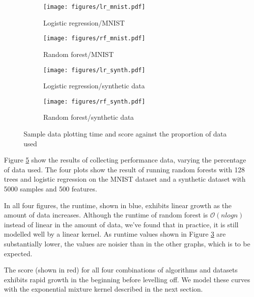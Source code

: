 \documentclass[a4paper,12pt,twoside,openright]{report}
\begin{document}
\begin{figure}
\centering
\begin{subfigure}{.45\textwidth}
  \centering
  \texttt{[image: figures/lr\_mnist.pdf]}
  \caption{Logistic regression/MNIST}
  \label{sampledata1}
\end{subfigure}%
\begin{subfigure}{.45\textwidth}
  \centering
  \texttt{[image: figures/rf\_mnist.pdf]}
  \caption{Random forest/MNIST}
  \label{sampledata2}
\end{subfigure}
\begin{subfigure}{.45\textwidth}
  \centering
  \texttt{[image: figures/lr\_synth.pdf]}
  \caption{Logistic regression/synthetic data}
  \label{sampledata3}
\end{subfigure}
\begin{subfigure}{.45\textwidth}
  \centering
  \texttt{[image: figures/rf\_synth.pdf]}
  \caption{Random forest/synthetic data}
  \label{sampledata4}
\end{subfigure}
\caption{Sample data plotting time and score against the proportion of data used}
\label{sampledata}
\end{figure}




Figure \ref{sampledata} show the results of collecting performance data, varying the percentage of data used. The four plots show the result of running random forests with 128 trees and logistic regression on the MNIST dataset and a synthetic dataset with 5000 samples and 500 features.

In all four figures, the runtime, shown in blue, exhibits linear growth as the amount of data increases. Although the runtime of random forest is $\mathcal{O}(n log n)$ instead of linear in the amount of data, we've found that in practice, it is still modelled well by a linear kernel. As runtime values shown in Figure \ref{sampledata3} are substantially lower, the values are noisier than in the other graphs, which is to be expected. 

The score (shown in red) for all four combinations of algorithms and datasets exhibits rapid growth in the beginning before levelling off. We model these curves with the exponential mixture kernel described in the next section.
\end{document}
